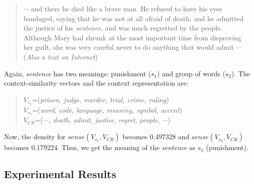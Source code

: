 \vspace{0.3cm}
\begin{quote}
\small $\cdots$ and there he died like a brave man.  He refused to have his eyes bandaged, saying that he was 
not at all afraid of death; and he admitted the justice of his {\it sentence}, and was much regretted by 
the people.  Although Mary had shrunk at the most important time from disproving her guilt, she was 
very careful never to do anything that would admit $\cdots$ ({\it Also a text on Internet})
\end{quote}
\vspace{0.2cm}
Again, {\it sentence} has two meanings: punishment ($s_1$) and group of words ($s_2$).  
The context-similarity vectors and the context representation are:
\begin{quote}
$V_{s_1}$=({\it prison, judge, murder, trial, crime, ruling}) \\
$V_{s_2}$=({\it word, code, language, meaning, symbol, accent}) \\
$V_{CR}$=({\it $\cdots$, death, admit, justice, regret, people, $\cdots$})
\end{quote}
Now, the density for $sense(V_{s_1},V_{CR})$ becomes 0.497328 and $sense(V_{s_2},V_{CR})$ becomes
 0.179224.  Thus, we get the meaning of the {\it sentence} as $s_1$ (punishment).
\subsection{Experimental Results}


